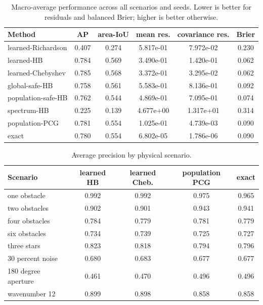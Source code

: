 \documentclass[10pt]{article}
\begin{document}
\begin{table}[t]
\centering\small
\caption{Macro-average performance across all scenarios and seeds.  Lower is
better for residuals and balanced Brier; higher is better otherwise.}
\begin{tabular}{lccccc}
\toprule
Method & AP & area-IoU & mean res. & covariance res. & Brier\\
\midrule
learned-Richardson & 0.407 & 0.274 & 5.817e-01 & 7.972e-02 & 0.230 \\
learned-HB & 0.784 & 0.569 & 3.490e-01 & 1.420e-01 & 0.062 \\
learned-Chebyshev & 0.785 & 0.568 & 3.372e-01 & 3.295e-02 & 0.062 \\
global-safe-HB & 0.758 & 0.561 & 5.583e-01 & 8.136e-01 & 0.092 \\
population-safe-HB & 0.762 & 0.544 & 4.869e-01 & 7.095e-01 & 0.074 \\
spectrum-HB & 0.225 & 0.139 & 4.677e+00 & 1.317e+01 & 0.314 \\
population-PCG & 0.781 & 0.554 & 1.025e-01 & 4.739e-03 & 0.090 \\
exact & 0.780 & 0.554 & 6.802e-05 & 1.786e-06 & 0.090 \\
\bottomrule
\end{tabular}
\end{table}

\begin{table}[t]
\centering\scriptsize
\caption{Average precision by physical scenario.}
\begin{tabular}{lcccc}
\toprule
Scenario & learned HB & learned Cheb. & population PCG & exact\\
\midrule
one obstacle & 0.992 & 0.992 & 0.975 & 0.965 \\
two obstacles & 0.902 & 0.901 & 0.943 & 0.941 \\
four obstacles & 0.784 & 0.779 & 0.781 & 0.779 \\
six obstacles & 0.734 & 0.739 & 0.725 & 0.727 \\
three stars & 0.823 & 0.818 & 0.794 & 0.796 \\
30 percent noise & 0.680 & 0.683 & 0.677 & 0.677 \\
180 degree aperture & 0.461 & 0.470 & 0.496 & 0.496 \\
wavenumber 12 & 0.899 & 0.898 & 0.858 & 0.858 \\
\bottomrule
\end{tabular}
\end{table}
\end{document}
